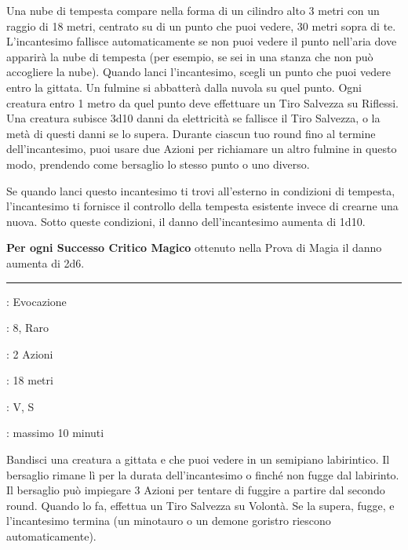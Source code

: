 \begin{multicols}{2}
Una nube di tempesta compare nella forma di un cilindro alto 3 metri con un raggio di 18 metri, centrato su di un punto che puoi vedere, 30 metri sopra di te. L'incantesimo fallisce automaticamente se non puoi vedere il punto nell'aria dove apparirà la nube di tempesta (per esempio, se sei in una stanza che non può accogliere la nube). Quando lanci l'incantesimo, scegli un punto che puoi vedere entro la gittata. Un fulmine si abbatterà dalla nuvola su quel punto. Ogni creatura entro 1 metro da quel punto deve effettuare un Tiro Salvezza su Riflessi. Una creatura subisce 3d10 danni da elettricità se fallisce il Tiro Salvezza, o la metà di questi danni se lo supera. Durante ciascun tuo round fino al termine dell'incantesimo, puoi usare due Azioni per richiamare un altro fulmine in questo modo, prendendo come bersaglio lo stesso punto o uno diverso.

Se quando lanci questo incantesimo ti trovi all'esterno in condizioni di tempesta, l'incantesimo ti fornisce il controllo della tempesta esistente invece di crearne una nuova. Sotto queste condizioni, il danno dell'incantesimo aumenta di 1d10.

\textbf{Per ogni Successo Critico Magico} ottenuto nella Prova di Magia il danno aumenta di 2d6.

\smallskip\noindent\rule{\linewidth}{2pt} \hypertarget{Labirinto}{}\smallskip{}
\noindent
\begin{description}[noitemsep, topsep=0pt, parsep=0pt, partopsep=0pt, leftmargin=0cm, labelwidth=2.8cm]
	\item[\textbf{Lista di Magia}]: Evocazione
	\item[\textbf{Livello}]: 8, Raro
	\item[\textbf{T. di Lancio}]: 2 Azioni
	\item[\textbf{Gittata}]: 18 metri
	\item[\textbf{Componenti}]: V, S
	\item[\textbf{Durata}]: massimo 10 minuti
\end{description}

Bandisci una creatura a gittata e che puoi vedere in un semipiano labirintico. Il bersaglio rimane lì per la durata dell'incantesimo o finché non fugge dal labirinto. Il bersaglio può impiegare 3 Azioni per tentare di fuggire a partire dal secondo round. Quando lo fa, effettua un Tiro Salvezza su Volontà. Se la supera, fugge, e l'incantesimo termina (un minotauro o un demone goristro riescono automaticamente).


\end{multicols}

